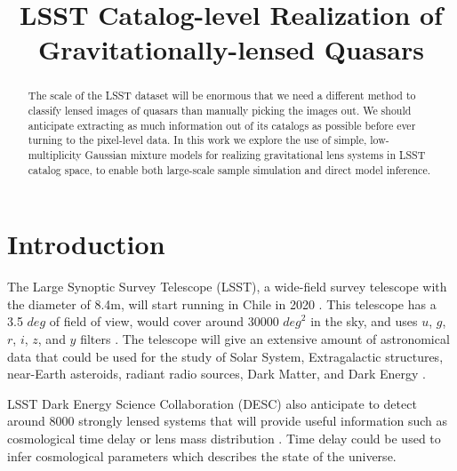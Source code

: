 \documentclass[\docopts]{\docclass}
\begin{document}
\title{ LSST Catalog-level Realization of Gravitationally-lensed Quasars }

\maketitlepre

\begin{abstract}

The scale of the LSST dataset will be enormous that we need a different method to classify lensed images of quasars than manually picking the images out. We should anticipate extracting as much information out of its catalogs as possible before ever turning to the pixel-level data. In this work we explore the use of simple, low-multiplicity Gaussian mixture models for realizing gravitational lens systems in LSST catalog space, to enable both large-scale sample simulation and direct model inference.


\end{abstract}


\maketitlepost


\section{Introduction}
\label{sec:intro}

The Large Synoptic Survey Telescope (LSST), a wide-field survey telescope with the diameter of 8.4m, will start running in Chile in 2020 \cite{LSST_overall}. This telescope has a 3.5 $deg$ of field of view, would cover around 30000 $\textit{deg}^2$ in the sky, and uses $u$, $g$, $r$, $i$, $z$, and $y$ filters \cite{LSSTScienceBookv2}. The telescope will give an extensive amount of astronomical data that could be used for the study of Solar System, Extragalactic structures, near-Earth asteroids, radiant radio sources, Dark Matter, and Dark Energy \cite{LSSTScienceBookv2}. 


LSST Dark Energy Science Collaboration (DESC) also anticipate to detect around 8000 strongly lensed systems that will provide useful information such as cosmological time delay or lens mass distribution \cite{DESC_overall} \cite{TimeDelayOverall} \cite{Twinkles}. Time delay could be used to infer cosmological parameters \cite{Cosmology from Gravitational Lens Time Delays and Planck Data} \cite{Dissecting the Gravitational Lens B1608+656} \cite{Treu2010} which describes the state of the universe.
\end{document}
